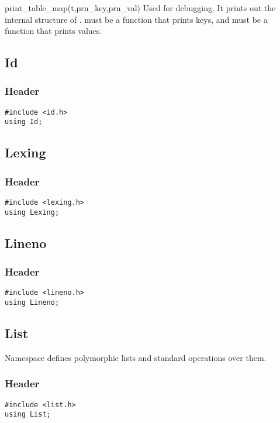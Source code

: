 \begin{defun}{print_table_map}{(t,prn_key,prn_val)}
Used for debugging.  It prints out the internal structure of .
 must be a function that prints keys, and 
must be a function that prints values.
\end{defun}

\subsection{Id}

\subsubsection*{Header}
\begin{verbatim}
#include <id.h>
using Id;
\end{verbatim}

\subsection{Lexing}

\subsubsection*{Header}
\begin{verbatim}
#include <lexing.h>
using Lexing;
\end{verbatim}

\subsection{Lineno}

\subsubsection*{Header}
\begin{verbatim}
#include <lineno.h>
using Lineno;
\end{verbatim}

\subsection{List}

Namespace  defines polymorphic lists and standard operations
over them.

\subsubsection*{Header}
\begin{verbatim}
#include <list.h>
using List;
\end{verbatim}

